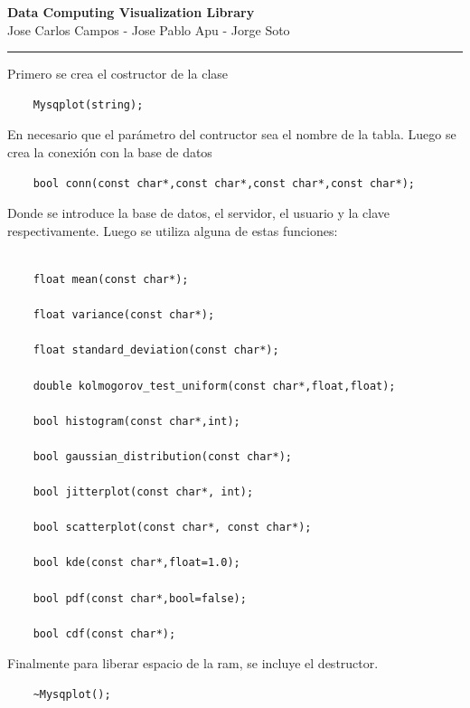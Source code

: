 \documentclass[11pt]{article}
\begin{document}
\begin{center}
{ \huge \bfseries Data Computing Visualization Library }\\[0.2cm]
{ Jose Carlos Campos - Jose Pablo Apu - Jorge Soto }\\[0.2cm]
\rule{\linewidth}{0.25mm}
\end{center}

Primero se crea el costructor de la clase\\
\begin{lstlisting}
	Mysqplot(string);
\end{lstlisting}	
En necesario que el parámetro del contructor sea el nombre de la tabla. Luego se crea la conexión con la base de datos\\
\begin{lstlisting}
	bool conn(const char*,const char*,const char*,const char*); 
\end{lstlisting}
Donde se introduce la base de datos, el servidor, el usuario y la clave respectivamente. Luego se utiliza alguna de estas funciones:

\begin{lstlisting}

	float mean(const char*);
	
	float variance(const char*);
	
	float standard_deviation(const char*);
	
	double kolmogorov_test_uniform(const char*,float,float);

	bool histogram(const char*,int);
	
	bool gaussian_distribution(const char*);
	
	bool jitterplot(const char*, int);
		
	bool scatterplot(const char*, const char*);
	
	bool kde(const char*,float=1.0);
	 
	bool pdf(const char*,bool=false);
	 
	bool cdf(const char*);

\end{lstlisting}
  	
Finalmente para liberar espacio de la ram, se incluye el destructor.
\begin{lstlisting}
	~Mysqplot();
\end{lstlisting}
\end{document}
